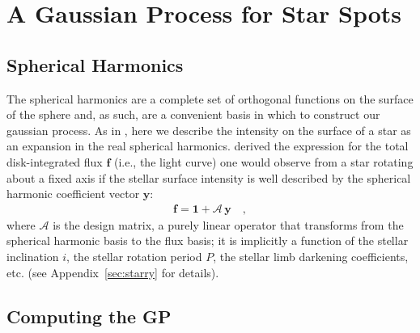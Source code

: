 \documentclass[modern]{aastex62}
\begin{document}
\section{A Gaussian Process for Star Spots}
\label{sec:main}

\subsection{Spherical Harmonics}
\label{sec:ylm}
%
The spherical harmonics are a complete set of orthogonal functions on the
surface of the sphere and, as such, are a convenient basis in which to construct
our gaussian process. As in \citet{Luger2019}, here we describe the intensity
on the surface of a star as an expansion in the real spherical harmonics.
%
\citet{Luger2019} derived the expression for the total disk-integrated
flux $\mathbf{f}$ (i.e., the light curve)
one would observe from a star rotating about a fixed axis
if the stellar surface intensity is well described by the spherical harmonic
coefficient vector $\mathbf{y}$:
%
\begin{align}
    \label{eq:fAy}
    \mathbf{f} = \mathbf{1} + \pmb{\mathcal{A}} \, \mathbf{y}
    \quad,
\end{align}
%
where $\pmb{\mathcal{A}}$ is the \starry
design matrix, a purely linear operator that transforms from the spherical
harmonic basis to the flux basis; it is implicitly
a function of the stellar inclination $i$, the stellar
rotation period $P$, the stellar limb darkening coefficients, etc.
(see Appendix~\ref{sec:starry} for details).

\subsection{Computing the GP}
\label{sec:gp}
%

\end{document}
